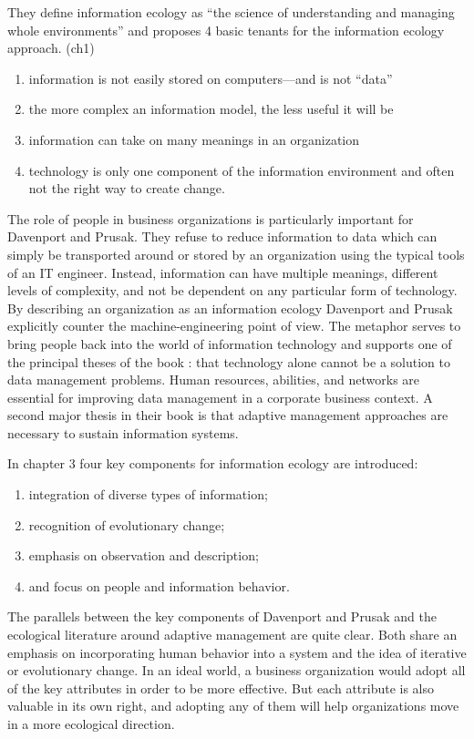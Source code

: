 They define information ecology as ``the science of understanding and managing whole environments'' and proposes 4 basic tenants for the information ecology approach. (ch1)
\begin{enumerate}
\item information is not easily stored on computers—and is not ``data''
\item the more complex an information model, the less useful it will be
\item information can take on many meanings in an organization
\item technology is only one component of the information environment and often not the right way to create change.
\end{enumerate}

The role of people in business organizations is particularly important for Davenport and Prusak.  They refuse to reduce information to data which can simply be transported around or stored by an organization using the typical tools of an IT engineer.  Instead, information can have multiple meanings, different levels of complexity, and not be dependent on any particular form of technology. By describing an organization as an information ecology Davenport and Prusak explicitly counter the machine-engineering point of view. The metaphor serves to bring people back into the world of information technology and supports one of the principal theses of the book : that technology alone cannot be a solution to data management problems. Human resources, abilities, and networks are essential for improving data management in a corporate business context. A second major thesis in their book is that adaptive management approaches are necessary to sustain information systems.

In chapter 3 four key components for information ecology are introduced: 

\begin{enumerate}
\item integration of diverse types of information;
\item recognition of evolutionary change;
\item emphasis on observation and description;
\item and focus on people and information behavior.
\end{enumerate}

The parallels between the key components of Davenport and Prusak and the ecological literature around adaptive management are quite clear. Both share an emphasis on incorporating human behavior into a system and the idea of iterative or evolutionary change.  In an ideal world, a business organization would adopt all of the key attributes in order to be more effective. But each attribute is also valuable in its own right, and adopting any of them will help organizations move in a more ecological direction.

